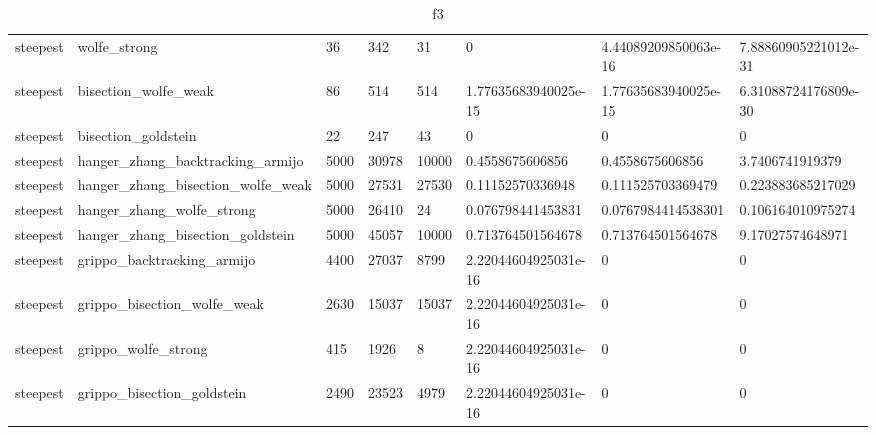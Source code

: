 \documentclass[a4paper,11pt]{article}
\numberwithin{equation}{section} %
\begin{document}
\begin{table}[h!]
{\begin{tabular}{|l|l|l|l|l|l|l|l|}
        steepest & wolfe\_strong & 36 & 342 & 31 & 0 & 4.44089209850063e-16 & 7.88860905221012e-31 \\
        steepest & bisection\_wolfe\_weak & 86 & 514 & 514 & 1.77635683940025e-15 & 1.77635683940025e-15 & 6.31088724176809e-30 \\
        steepest & bisection\_goldstein & 22 & 247 & 43 & 0 & 0 & 0 \\
        steepest & hanger\_zhang\_backtracking\_armijo & 5000 & 30978 & 10000 & 0.4558675606856 & 0.4558675606856 & 3.7406741919379 \\
        steepest & hanger\_zhang\_bisection\_wolfe\_weak & 5000 & 27531 & 27530 & 0.11152570336948 & 0.111525703369479 & 0.223883685217029 \\
        steepest & hanger\_zhang\_wolfe\_strong & 5000 & 26410 & 24 & 0.076798441453831 & 0.0767984414538301 & 0.106164010975274 \\
        steepest & hanger\_zhang\_bisection\_goldstein & 5000 & 45057 & 10000 & 0.713764501564678 & 0.713764501564678 & 9.17027574648971 \\
        steepest & grippo\_backtracking\_armijo & 4400 & 27037 & 8799 & 2.22044604925031e-16 & 0 & 0 \\
        steepest & grippo\_bisection\_wolfe\_weak & 2630 & 15037 & 15037 & 2.22044604925031e-16 & 0 & 0 \\
        steepest & grippo\_wolfe\_strong & 415 & 1926 & 8 & 2.22044604925031e-16 & 0 & 0 \\
        steepest & grippo\_bisection\_goldstein & 2490 & 23523 & 4979 & 2.22044604925031e-16 & 0 & 0 \\

\end{tabular}}
\caption{f3}
\label{table:f3}
\end{table}
\end{document}
